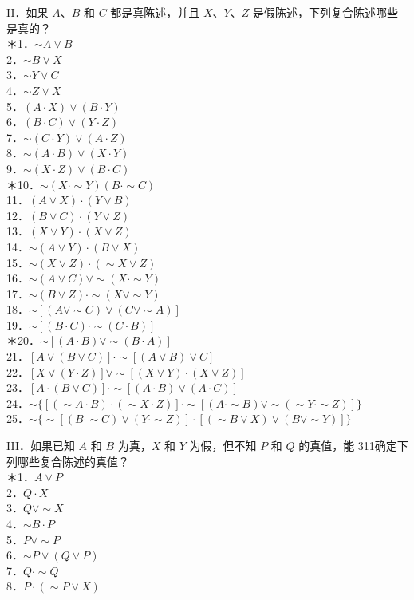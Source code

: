 II．如果 $A 、 B$ 和 $C$ 都是真陈述，并且 $X 、 Y 、 Z$ 是假陈述，下列复合陈述哪些是真的？\\
＊1．$\sim A \vee B$\\
2．$\sim B \vee X$\\
3．$\sim Y \vee C$\\
4．$\sim Z \vee X$\\
5．$(A \cdot X) \vee(B \cdot Y)$\\
6．$(B \cdot C) \vee(Y \cdot Z)$\\
7．$\sim(C \cdot Y) \vee(A \cdot Z)$\\
8．$\sim(A \cdot B) \vee(X \cdot Y)$\\
9．$\sim(X \cdot Z) \vee(B \cdot C)$\\
＊10．$\sim(X \cdot \sim Y)(B \cdot \sim C)$\\
11．$(A \vee X) \cdot(Y \vee B)$\\
12．$(B \vee C) \cdot(Y \vee Z)$\\
13．$(X \vee Y) \cdot(X \vee Z)$\\
14．$\sim(A \vee Y) \cdot(B \vee X)$\\
15．$\sim(X \vee Z) \cdot(\sim X \vee Z)$\\
16．$\sim(A \vee C) \vee \sim(X \cdot \sim Y)$\\
17．$\sim(B \vee Z) \cdot \sim(X \vee \sim Y)$\\
18．$\sim[(A \vee \sim C) \vee(C \vee \sim A)]$\\
19．$\sim[(B \cdot C) \cdot \sim(C \cdot B)]$\\
＊20．$\sim[(A \cdot B) \vee \sim(B \cdot A)]$\\
21．$[A \vee(B \vee C)] \cdot \sim[(A \vee B) \vee C]$\\
22．$[X \vee(Y \cdot Z)] \vee \sim[(X \vee Y) \cdot(X \vee Z)]$\\
23．$[A \cdot(B \vee C)] \cdot \sim[(A \cdot B) \vee(A \cdot C)]$\\
24．$\sim\{[(\sim A \cdot B) \cdot(\sim X \cdot Z)] \cdot \sim[(A \cdot \sim B) \vee \sim(\sim Y \cdot \sim Z)]\}$\\
25．$\sim\{\sim[(B \cdot \sim C) \vee(Y \cdot \sim Z)] \cdot[(\sim B \vee X) \vee(B \vee \sim Y)]\}$

III．如果已知 $A$ 和 $B$ 为真，$X$ 和 $Y$ 为假，但不知 $P$ 和 $Q$ 的真值，能 311确定下列哪些复合陈述的真值？\\
＊1．$A \vee P$\\
2．$Q \cdot X$\\
3．$Q \vee \sim X$\\
4．$\sim B \cdot P$\\
5．$P \vee \sim P$\\
6．$\sim P \vee(Q \vee P)$\\
7．$Q \cdot \sim Q$\\
8．$P \cdot(\sim P \vee X)$

